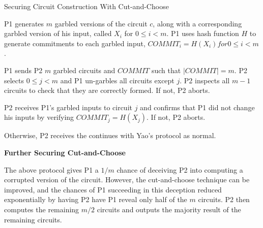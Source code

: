 \begin{algorithm}[H]
    \caption{Securing Circuit Construction With Cut-and-Choose}
    \label{alg:otmalicious}
    \begin{algorithmic}[1]
        \STATE \ac{P1} generates $m$ garbled versions of the circuit $c$, along with a corresponding garbled version of his input, called $X_i$ for $0 \leq i < m$.
        \STATE \ac{P1} uses hash function $H$ to generate commitments to each garbled input, $COMMIT_i = H(X_i) for 0 \leq i < m$.

        \STATE \ac{P1} sends \ac{P2} $m$ garbled circuits and $COMMIT$ such that $|COMMIT| = m$.
        \STATE \ac{P2} selects $0 \leq j < m$ and \ac{P1} un-garbles all circuits except $j$.
        \STATE \ac{P2} inspects all $m-1$ circuits to check that they are correctly formed. If not, \ac{P2} aborts.

        \STATE \ac{P2} receives \ac{P1}'s garbled inputs to circuit $j$ and confirms that \ac{P1} did not change his inputs by verifying $COMMIT_j = H(X_j)$. If not, \ac{P2} aborts.

        \STATE Otherwise, \ac{P2} receives the continues with Yao's protocol as normal.
    \end{algorithmic}
\end{algorithm}


\noindent\textbf{Further Securing Cut-and-Choose}

The above protocol gives \ac{P1} a $1/m$ chance of deceiving \ac{P2} into computing a corrupted version of the circuit.  However, the cut-and-choose technique can be improved, and the chances of \ac{P1} succeeding in this deception reduced exponentially by having \ac{P2} have \ac{P1} reveal only half of the $m$ circuits.  \ac{P2} then computes the remaining $m/2$ circuits and outputs the majority result of the remaining circuits.




